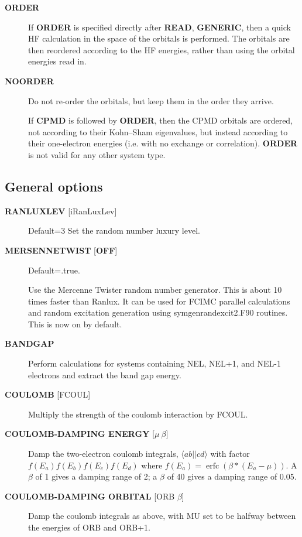 \documentclass[openany,a4paper,10pt,english]{manual}
\newcommand{\bra}{\ensuremath{\langle}}
\newcommand{\ket}{\ensuremath{\rangle}}
\begin{document}
\begin{description}
\item[\textbf{ORDER}] \leavevmode
If \textbf{ORDER} is specified directly after \textbf{READ}, \textbf{GENERIC},
then a quick HF calculation in the space of the orbitals is performed.
The orbitals are then reordered according to the HF energies,
rather than using the orbital energies read in.

\item[\textbf{NOORDER}] \leavevmode
Do not re-order the orbitals, but keep them in the order they arrive.

If \textbf{CPMD} is followed by \textbf{ORDER}, then the CPMD orbitals are
ordered, not according to their Kohn--Sham eigenvalues, but instead
according to their one-electron energies (i.e. with no exchange or
correlation).  \textbf{ORDER} is not valid for any other system type.

\end{description}


\subsection{General options}
\begin{description}
\item[\textbf{RANLUXLEV} {[}iRanLuxLev{]}] \leavevmode
Default=3
Set the random number luxury level.

\item[\textbf{MERSENNETWIST} {[}\textbf{OFF}{]}] \leavevmode
Default=.true.

Use the Mercenne Twister random number generator. This is about 10 times
faster than Ranlux. It can be used for FCIMC parallel calculations and random
excitation generation using symgenrandexcit2.F90 routines. This is now on
by default.

\item[\textbf{BANDGAP}] \leavevmode
Perform calculations for systems containing NEL, NEL+1, and NEL-1
electrons and extract the band gap energy.

\item[\textbf{COULOMB} {[}FCOUL{]}] \leavevmode
Multiply the strength of the coulomb interaction by FCOUL.

\item[\textbf{COULOMB-DAMPING ENERGY} {[}$\mu\ \beta${]}] \leavevmode
Damp the two-electron coulomb integrals, $\bra ab ||
c d\ket$ with factor $f(E_a)f(E_b)f(E_c)f(E_d)$ where
$f(E_a)=\operatorname{erfc}(\beta*(E_a-\mu))$.  A $\beta$
of 1 gives a damping range of 2; a $\beta$ of 40 gives a damping
range of 0.05.

\item[\textbf{COULOMB-DAMPING ORBITAL} {[}ORB $\beta${]}] \leavevmode
Damp the coulomb integrals as above, with MU set to be halfway between
the energies of ORB and ORB+1.

\end{description}
\end{document}

